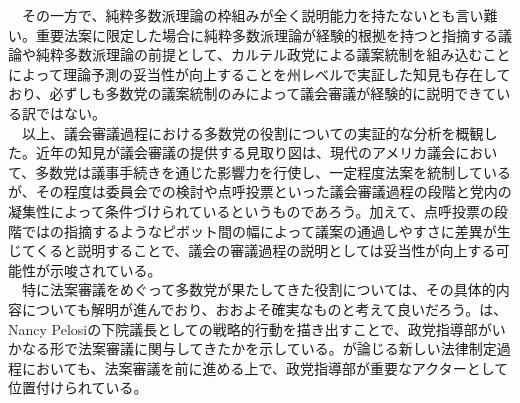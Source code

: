 \documentclass{article}
\begin{document}
　その一方で、純粋多数派理論の枠組みが全く説明能力を持たないとも言い難い。重要法案に限定した場合に純粋多数派理論が経験的根拠を持つと指摘する議論\citep*{Gray2019-sv}や純粋多数派理論の前提として、カルテル政党による議案統制を組み込むことによって理論予測の妥当性が向上することを州レベルで実証した知見\citep*{Crosson2019-xb}も存在しており、必ずしも多数党の議案統制のみによって議会審議が経験的に説明できている訳ではない。\\
　以上、議会審議過程における多数党の役割についての実証的な分析を概観した。近年の知見が議会審議の提供する見取り図は、現代のアメリカ議会において、多数党は議事手続きを通じた影響力を行使し、一定程度法案を統制しているが、その程度は委員会での検討や点呼投票といった議会審議過程の段階と党内の凝集性によって条件づけられているというものであろう。加えて、点呼投票の段階では\citet*{Krehbiel1998-ob,Krehbiel2010-ob}の指摘するようなピボット間の幅によって議案の通過しやすさに差異が生じてくると説明することで、議会の審議過程の説明としては妥当性が向上する可能性が示唆されている。\\
　特に法案審議をめぐって多数党が果たしてきた役割については、その具体的内容についても解明が進んでおり、おおよそ確実なものと考えて良いだろう。\citet*{Rosenthal2008-xb,Peters2010-ve}は、Nancy Pelosiの下院議長としての戦略的行動を描き出すことで、政党指導部がいかなる形で法案審議に関与してきたかを示している。\citet*{Sinclair1997-jm,Sinclair2016-kh}が論じる新しい法律制定過程においても、法案審議を前に進める上で、政党指導部が重要なアクターとして位置付けられている。\\
\end{document}
